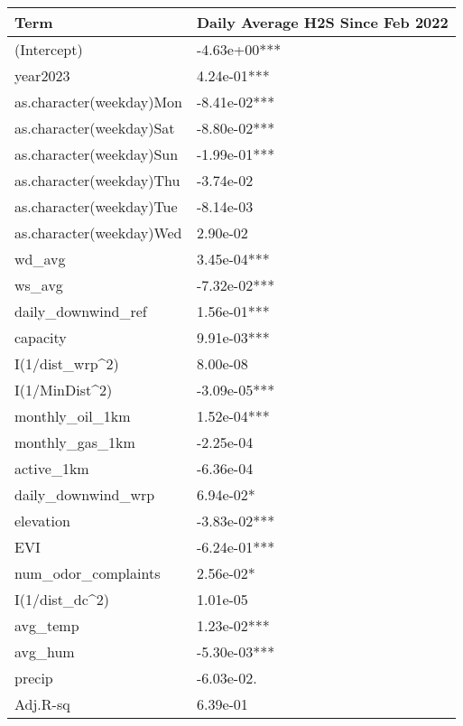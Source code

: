 
\begin{tabular}{l|l}
\hline
Term & Daily Average H2S Since Feb 2022\\
\hline
(Intercept) & -4.63e+00***\\
\hline
year2023 & 4.24e-01***\\
\hline
as.character(weekday)Mon & -8.41e-02***\\
\hline
as.character(weekday)Sat & -8.80e-02***\\
\hline
as.character(weekday)Sun & -1.99e-01***\\
\hline
as.character(weekday)Thu & -3.74e-02\\
\hline
as.character(weekday)Tue & -8.14e-03\\
\hline
as.character(weekday)Wed & 2.90e-02\\
\hline
wd\_avg & 3.45e-04***\\
\hline
ws\_avg & -7.32e-02***\\
\hline
daily\_downwind\_ref & 1.56e-01***\\
\hline
capacity & 9.91e-03***\\
\hline
I(1/dist\_wrp\textasciicircum{}2) & 8.00e-08\\
\hline
I(1/MinDist\textasciicircum{}2) & -3.09e-05***\\
\hline
monthly\_oil\_1km & 1.52e-04***\\
\hline
monthly\_gas\_1km & -2.25e-04\\
\hline
active\_1km & -6.36e-04\\
\hline
daily\_downwind\_wrp & 6.94e-02*\\
\hline
elevation & -3.83e-02***\\
\hline
EVI & -6.24e-01***\\
\hline
num\_odor\_complaints & 2.56e-02*\\
\hline
I(1/dist\_dc\textasciicircum{}2) & 1.01e-05\\
\hline
avg\_temp & 1.23e-02***\\
\hline
avg\_hum & -5.30e-03***\\
\hline
precip & -6.03e-02.\\
\hline
Adj.R-sq & 6.39e-01\\
\hline
\end{tabular}

